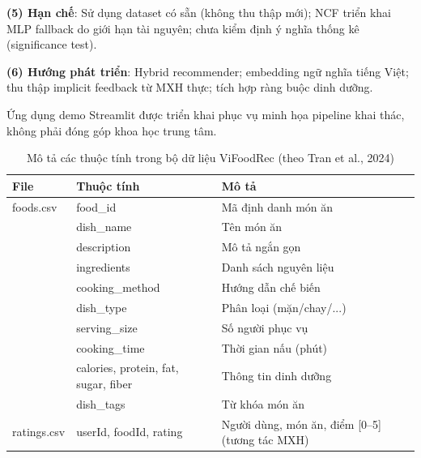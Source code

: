 \documentclass[11pt]{article}
\begin{document}
\textbf{(5) Hạn chế}: Sử dụng dataset có sẵn (không thu thập mới); NCF triển khai MLP fallback do giới hạn tài nguyên; chưa kiểm định ý nghĩa thống kê (significance test).

\textbf{(6) Hướng phát triển}: Hybrid recommender; embedding ngữ nghĩa tiếng Việt; thu thập implicit feedback từ MXH thực; tích hợp ràng buộc dinh dưỡng.

Ứng dụng demo Streamlit được triển khai phục vụ minh họa pipeline khai thác, không phải đóng góp khoa học trung tâm.

\appendix
\begin{table}[t]
\centering
\caption{Mô tả các thuộc tính trong bộ dữ liệu ViFoodRec (theo Tran et al., 2024)}
\label{tab:attributes}
\small
\begin{tabular}{llp{7cm}}
\toprule
\textbf{File} & \textbf{Thuộc tính} & \textbf{Mô tả} \\\midrule
foods.csv & food\_id & Mã định danh món ăn \\& dish\_name & Tên món ăn \\& description & Mô tả ngắn gọn \\& ingredients & Danh sách nguyên liệu \\& cooking\_method & Hướng dẫn chế biến \\& dish\_type & Phân loại (mặn/chay/...) \\& serving\_size & Số người phục vụ \\& cooking\_time & Thời gian nấu (phút) \\& calories, protein, fat, sugar, fiber & Thông tin dinh dưỡng \\& dish\_tags & Từ khóa món ăn \\ratings.csv & userId, foodId, rating & Người dùng, món ăn, điểm [0--5] (tương tác MXH) \\\bottomrule
\end{tabular}
\end{table}
\end{document}
